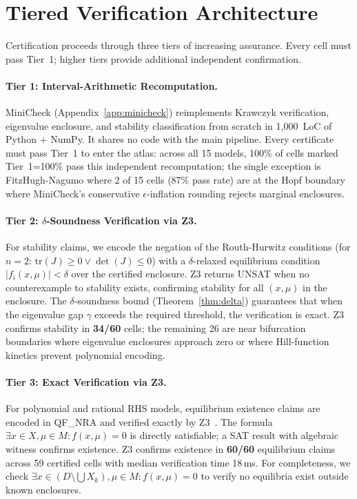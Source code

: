 \documentclass[11pt]{article}
\begin{document}
\section{Tiered Verification Architecture}
\label{sec:tiered}

Certification proceeds through three tiers of increasing assurance.
Every cell must pass Tier~1; higher tiers provide additional independent confirmation.

\paragraph{Tier 1: Interval-Arithmetic Recomputation.}
MiniCheck (Appendix~\ref{app:minicheck}) reimplements Krawczyk verification, eigenvalue enclosure, and stability classification from scratch in 1{,}000~LoC of Python + NumPy.
It shares no code with the main pipeline.
Every certificate must pass Tier~1 to enter the atlas: across all 15 models, 100\% of cells marked Tier~1=100\% pass this independent recomputation; the single exception is FitzHugh-Nagumo where 2 of 15 cells (87\% pass rate) are at the Hopf boundary where MiniCheck's conservative $\epsilon$-inflation rounding rejects marginal enclosures.

\paragraph{Tier 2: $\delta$-Soundness Verification via Z3.}
For stability claims, we encode the negation of the Routh-Hurwitz conditions (for $n=2$: $\mathrm{tr}(J) \geq 0 \lor \det(J) \leq 0$) with a $\delta$-relaxed equilibrium condition $|f_i(x,\mu)| < \delta$ over the certified enclosure.
Z3 returns UNSAT when no counterexample to stability exists, confirming stability for all $(x,\mu)$ in the enclosure.
The $\delta$-soundness bound (Theorem~\ref{thm:delta}) guarantees that when the eigenvalue gap $\gamma$ exceeds the required threshold, the verification is exact.
Z3 confirms stability in \textbf{34/60} cells; the remaining 26 are near bifurcation boundaries where eigenvalue enclosures approach zero or where Hill-function kinetics prevent polynomial encoding.

\paragraph{Tier 3: Exact Verification via Z3.}
For polynomial and rational RHS models, equilibrium existence claims are encoded in QF\_NRA and verified exactly by Z3~\cite{demoura2008z3}.
The formula $\exists x \in X, \mu \in M : f(x,\mu) = 0$ is directly satisfiable; a SAT result with algebraic witness confirms existence.
Z3 confirms existence in \textbf{60/60} equilibrium claims across 59 certified cells with median verification time 18\,ms.
For completeness, we check $\exists x \in (D \setminus \bigcup X_k), \mu \in M : f(x,\mu) = 0$ to verify no equilibria exist outside known enclosures.
\end{document}
